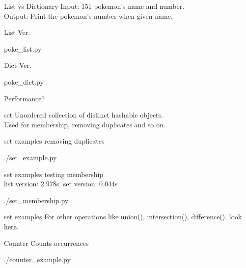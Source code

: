 \documentclass{beamer}
\begin{document}
\begin{frame}{List vs Dictionary}
  Input: 151 pokemon's name and number.\\
  Output: Print the pokemon's number when given name.
\end{frame}

\begin{frame}{List Ver.}
  \begin{lstinputlisting}
    {poke_list.py}
  \end{lstinputlisting}
\end{frame}

\begin{frame}{Dict Ver.}
  \begin{lstinputlisting}
    {poke_dict.py}
  \end{lstinputlisting}
\end{frame}

\begin{frame}{Performance?}

\end{frame}

\begin{frame}{set}
  Unordered collection of distinct hashable objects.\\
  Used for membership, removing duplicates and so on.
\end{frame}


\begin{frame}{set examples}
  removing duplicates
  \begin{lstinputlisting}
    {./set_example.py}
  \end{lstinputlisting}
\end{frame}

\begin{frame}{set examples}
  testing membership\\
  list version: 2.978s, set version: 0.044s
  \begin{lstinputlisting}
    {./set_membership.py}
  \end{lstinputlisting}
\end{frame}

\begin{frame}{set examples}
  For other operations like union(), intersection(), difference(), look
  \href{https://docs.python.org/2/library/stdtypes.html\#set}{here}.
\end{frame}

\begin{frame}{Counter}
  Counts occurrences
  \begin{lstinputlisting}
    {./counter_example.py}
  \end{lstinputlisting}
\end{frame}
\end{document}
